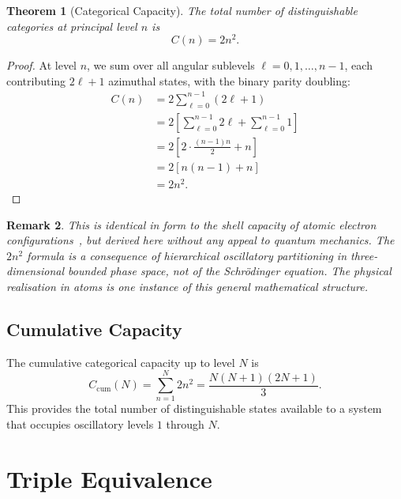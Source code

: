 \documentclass[11pt,twocolumn,a4paper]{article}
\newtheorem{theorem}{Theorem}[section]
\newtheorem{remark}[theorem]{Remark}
\begin{document}
\begin{theorem}[Categorical Capacity]\label{thm:capacity}
The total number of distinguishable categories at principal level $n$ is
\begin{equation}
    C(n) = 2n^2.
    \label{eq:capacity}
\end{equation}
\end{theorem}

\begin{proof}
At level $n$, we sum over all angular sublevels $\ell = 0, 1, \ldots, n-1$, each contributing $2\ell + 1$ azimuthal states, with the binary parity doubling:
\begin{align}
    C(n) &= 2 \sum_{\ell=0}^{n-1} (2\ell + 1) \nonumber \\
         &= 2 \left[ \sum_{\ell=0}^{n-1} 2\ell + \sum_{\ell=0}^{n-1} 1 \right] \nonumber \\
         &= 2 \left[ 2 \cdot \frac{(n-1)n}{2} + n \right] \nonumber \\
         &= 2 \left[ n(n-1) + n \right] \nonumber \\
         &= 2n^2.
\end{align}
\end{proof}

\begin{remark}
This is identical in form to the shell capacity of atomic electron configurations~\citep{bohr1913}, but derived here without any appeal to quantum mechanics. The $2n^2$ formula is a consequence of hierarchical oscillatory partitioning in three-dimensional bounded phase space, not of the Schr\"{o}dinger equation. The physical realisation in atoms is one \emph{instance} of this general mathematical structure.
\end{remark}

\subsection{Cumulative Capacity}

The cumulative categorical capacity up to level $N$ is
\begin{equation}
    C_{\text{cum}}(N) = \sum_{n=1}^{N} 2n^2 = \frac{N(N+1)(2N+1)}{3}.
    \label{eq:cumulative_capacity}
\end{equation}
This provides the total number of distinguishable states available to a system that occupies oscillatory levels $1$ through $N$.

\section{Triple Equivalence}\label{sec:triple_equivalence}
\end{document}
